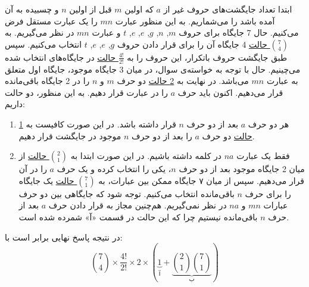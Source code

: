 \p
ابتدا تعداد جایگشت‌های  حروف غیر از 
$a$ که اولین $m$
 قبل از اولین $n$ 
 و چسبیده به آن آمده ‌باشد را می‌شماریم.
به این منظور عبارت $mn$ را یک عبارت مستقل فرض می‌کنیم.
حال 7 جایگاه برای حروف
$m$, 
$n$, 
$g$, 
$e$, 
$e$, 
$t$
و عبارت
 $mn$ 
در نظر می‌گیریم. 
به 
\underline{${7\choose 4}$ حالت}
 4 جایگاه آن را برای قرار دادن حروف 
$g$, 
$e$, 
$e$, 
$t$
انتخاب می‌کنیم.
 سپس طبق جایگشت حروف باتکرار، این حروف را به
 \underline{$\frac{4!}{2!}$ حالت}
در جایگاه‌های انتخاب شده می‌چینیم.
حال با توجه به خواسته‌ی سوال، در میان 3 جایگاه موجود،  
جایگاه اول متعلق به عبارت
 $mn$ می‌باشد.
  در نهایت به
 \underline{2 حالت}
 دو حرف
 $m$ و $n$
را در 2 جایگاه باقی‌مانده 
 قرار می‌دهیم.
اکنون باید حرف $a$ را در عبارت قرار دهیم.
به این منظور، دو حالت داریم:
\begin{enumerate}
  \item 
  
  هر دو حرف 
  $a$ بعد از دو حرف
  $n$ قرار داشته باشد. در این صورت کافیست به
  \underline{1 حالت}
  دو حرف 
  $a$ را بعد از دو حرف
  $n$ 
  موجود در جایگشت قرار دهیم.
  \item
  
  فقط یک عبارت 
  $na$
  در کلمه داشته‌ باشیم. در این صورت ابتدا به
  \underline{${2\choose 1}$ حالت}
  از میان 2 جایگاه موجود بعد از دو حرف
  $n$،  
  یکی را انتخاب کرده و یک حرف
  $a$
   را در آن قرار می‌دهیم. 
    سپس از میان ۷ جایگاه ممکن بین عبارات،
   به
   \underline{${7\choose 1}$ حالت}
   یک جایگاه را برای حرف 
   $n$ باقی‌مانده انتخاب می‌کنیم.
   توجه شود که جایگاهی بین دو حرف عبارات 
   $mn$ و $na$ 
   در نظر نمی‌گیریم.
   هم‌چنین مجاز به قرار دادن حرف 
   $a$ بعد از حرف $n$
    باقی‌مانده نیستیم چرا که این حالت در قسمت «آ» شمرده شده است.
\end{enumerate}
\p
در نتیجه پاسخ نهایی برابر است با:
$${7\choose 4} \times \frac{4!}{2!} \times 2 \times (\underbrace{1}_{\text{آ}} + \underbrace{{2\choose 1}{7\choose 1}}_{\text{ب}})$$
